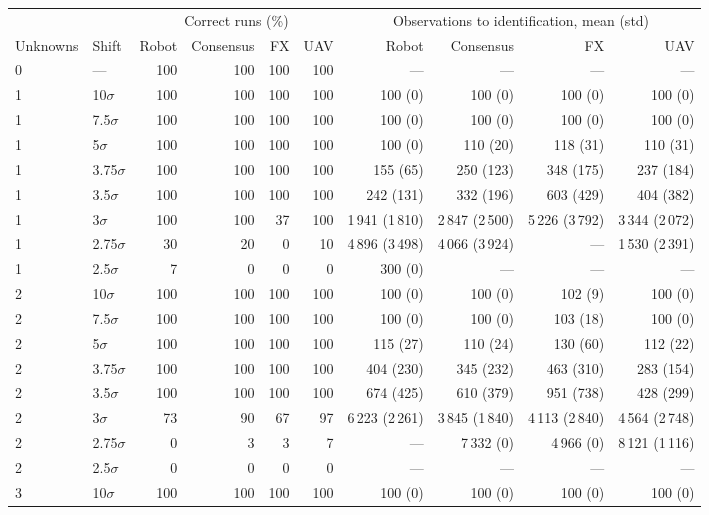 \begin{tabular}{@{}llrrrrrrrr@{}}
\toprule
 & & \multicolumn{4}{c}{Correct runs (\%)} & \multicolumn{4}{c}{Observations to identification, mean (std)}\\
\cmidrule(lr){3-6}\cmidrule(l){7-10}
Unknowns & Shift & Robot & Consensus & FX & UAV & Robot & Consensus & FX & UAV\\
\midrule
0 & --- & 100 & 100 & 100 & 100 & --- & --- & --- & ---\\
\midrule
1 & 10$\sigma$ & 100 & 100 & 100 & 100 & 100 (0) & 100 (0) & 100 (0) & 100 (0)\\
1 & 7.5$\sigma$ & 100 & 100 & 100 & 100 & 100 (0) & 100 (0) & 100 (0) & 100 (0)\\
1 & 5$\sigma$ & 100 & 100 & 100 & 100 & 100 (0) & 110 (20) & 118 (31) & 110 (31)\\
1 & 3.75$\sigma$ & 100 & 100 & 100 & 100 & 155 (65) & 250 (123) & 348 (175) & 237 (184)\\
1 & 3.5$\sigma$ & 100 & 100 & 100 & 100 & 242 (131) & 332 (196) & 603 (429) & 404 (382)\\
1 & 3$\sigma$ & 100 & 100 & 37 & 100 & 1\,941 (1\,810) & 2\,847 (2\,500) & 5\,226 (3\,792) & 3\,344 (2\,072)\\
1 & 2.75$\sigma$ & 30 & 20 & 0 & 10 & 4\,896 (3\,498) & 4\,066 (3\,924) & --- & 1\,530 (2\,391)\\
1 & 2.5$\sigma$ & 7 & 0 & 0 & 0 & 300 (0) & --- & --- & ---\\
\midrule
2 & 10$\sigma$ & 100 & 100 & 100 & 100 & 100 (0) & 100 (0) & 102 (9) & 100 (0)\\
2 & 7.5$\sigma$ & 100 & 100 & 100 & 100 & 100 (0) & 100 (0) & 103 (18) & 100 (0)\\
2 & 5$\sigma$ & 100 & 100 & 100 & 100 & 115 (27) & 110 (24) & 130 (60) & 112 (22)\\
2 & 3.75$\sigma$ & 100 & 100 & 100 & 100 & 404 (230) & 345 (232) & 463 (310) & 283 (154)\\
2 & 3.5$\sigma$ & 100 & 100 & 100 & 100 & 674 (425) & 610 (379) & 951 (738) & 428 (299)\\
2 & 3$\sigma$ & 73 & 90 & 67 & 97 & 6\,223 (2\,261) & 3\,845 (1\,840) & 4\,113 (2\,840) & 4\,564 (2\,748)\\
2 & 2.75$\sigma$ & 0 & 3 & 3 & 7 & --- & 7\,332 (0) & 4\,966 (0) & 8\,121 (1\,116)\\
2 & 2.5$\sigma$ & 0 & 0 & 0 & 0 & --- & --- & --- & ---\\
\midrule
3 & 10$\sigma$ & 100 & 100 & 100 & 100 & 100 (0) & 100 (0) & 100 (0) & 100 (0)\\

\end{tabular}
